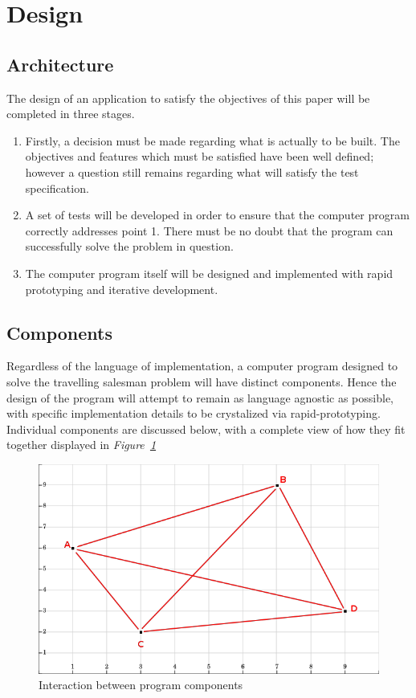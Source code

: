 \documentclass[12pt,a4paper]{article}
\begin{document}
\newpage
\section{Design}

\subsection{Architecture}

The design of an application to satisfy the objectives of this paper will be completed in three stages.
\begin{enumerate} \itemsep0pt
  \item Firstly, a decision must be made regarding what is actually to be built. The objectives and features which must be satisfied have been well defined; however a question still remains regarding what will satisfy the test specification. 
  \item A set of tests will be developed in order to ensure that the computer program correctly addresses point 1. There must be no doubt that the program can successfully solve the problem in question.
  \item The computer program itself will be designed and implemented with rapid prototyping and iterative development.
\end{enumerate}

\subsection{Components}

Regardless of the language of implementation, a computer program designed to solve the travelling salesman problem will have distinct components. Hence the design of the program will attempt to remain as language agnostic as possible, with specific implementation details to be crystalized via rapid-prototyping. Individual components are discussed below, with a complete view of how they fit together displayed in \textit{Figure~\ref{fig:components}}
\begin{figure}[h]
  \centering
  \includegraphics[scale=.50]{tsp2}
  \caption{Interaction between program components}
  \label{fig:components}
\end{figure}
\end{document}
